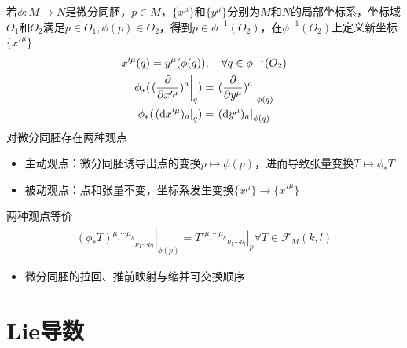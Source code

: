 若$\phi:M \to N$是微分同胚，$p \in M$，$\{x^{\mu}\}$和$\{y^{\mu}\}$分别为$M$和$N$的局部坐标系，坐标域$O_1$和$O_2$满足$p \in O_1,\phi(p) \in O_2$，得到$p \in \phi^{-1}(O_2)$，在$\phi^{-1}(O_2)$上定义新坐标$\{x'^{\mu}\}$
\begin{gather*}
    x'^{\mu}(q)=y^{\mu}(\phi(q)),\quad \forall q \in \phi^{-1}(O_2)
    \\
    \phi_{*}(\left.(\frac{\partial }{\partial x'^{\mu}})^a \right|_q)=\left.(\frac{\partial }{\partial y^{\mu}})^a \right|_{\phi(q)}
    \\
    \phi_{*}(\left.(\mathrm{d} x'^{\mu})_a \right|_q)=\left.(\mathrm{d} y^{\mu})_a \right|_{\phi(q)}
\end{gather*}
对微分同胚存在两种观点
\begin{itemize}
    \item 主动观点：微分同胚诱导出点的变换$p \mapsto \phi(p)$，进而导致张量变换$T \mapsto \phi_{*} T$
    \item 被动观点：点和张量不变，坐标系发生变换$\{x^{\mu}\} \to \{x'^{\mu}\}$
\end{itemize}
两种观点等价
\begin{gather*}
    \left.{(\phi_{*} T)^{\mu_1 \cdots \mu_k}}_{\nu_1 \cdots \nu_l} \right|_{\phi(p)}=\left.{T'^{\mu_1 \cdots \mu_k}}_{\nu_1 \cdots \nu_l} \right|_{p} \forall T \in \mathscr{F}_M(k,l)
\end{gather*}
\begin{itemize}
    \item 微分同胚的拉回、推前映射与缩并可交换顺序
\end{itemize}

\section{Lie导数}

